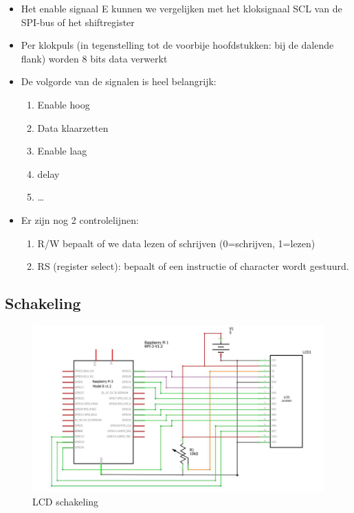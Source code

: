 \documentclass{article}
\begin{document}
\begin{itemize}
    \item Het enable signaal E kunnen we vergelijken met het kloksignaal SCL van de SPI-bus of het shiftregister
    \item Per klokpuls (in tegenstelling tot de voorbije hoofdstukken: bij de dalende flank) worden 8 bits data verwerkt
    \item De volgorde van de signalen is heel belangrijk:
    \begin{enumerate}
        \item Enable hoog
        \item Data klaarzetten
        \item Enable laag
        \item delay
        \item \dots
    \end{enumerate}
    \item Er zijn nog 2 controlelijnen:
    \begin{enumerate}
        \item R/W bepaalt of we data lezen of schrijven (0=schrijven, 1=lezen)
        \item RS (register select): bepaalt of een instructie of character wordt gestuurd. 
    \end{enumerate}
\end{itemize}

\subsection{Schakeling}

\begin{figure}[H]
    \centering
    \includegraphics[width=\textwidth]{lcd.png}
    \caption{LCD schakeling}
\end{figure}
\end{document}

